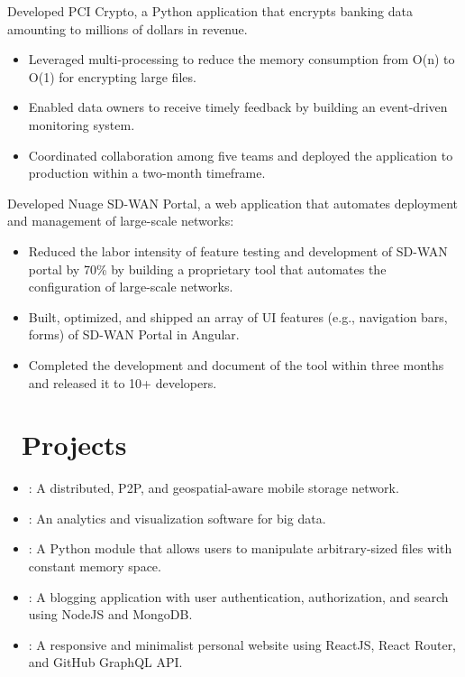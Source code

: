 \documentclass{resume}
\begin{document}
Developed PCI Crypto, a Python application that encrypts banking data amounting to millions of dollars in revenue.
\begin{itemize}
  \item {Leveraged multi-processing to reduce the memory consumption from O(n) to O(1) for encrypting large files.}
  \item {Enabled data owners to receive timely feedback by building an event-driven monitoring system.}
  \item {Coordinated collaboration among five teams and deployed the application to production within a two-month timeframe.}
\end{itemize}

Developed Nuage SD-WAN Portal, a web application that automates deployment and management of large-scale networks:
\begin{itemize}
  \item {Reduced the labor intensity of feature testing and development of SD-WAN portal by 70\%
        by building a proprietary tool that automates the configuration of large-scale networks.}
  \item {Built, optimized, and shipped an array of UI features (e.g., navigation bars, forms) of SD-WAN Portal in Angular.}
  \item {Completed the development and document of the tool within three months and released it to 10+ developers.}
\end{itemize}

\section{\faCodeFork\ Projects}
\begin{itemize}[parsep=0.5ex]
  \item {}: A distributed, P2P, and geospatial-aware mobile storage network.
  \item {}: An analytics and visualization software for big data.
  \item {}: A Python module that allows users to manipulate arbitrary-sized files with constant memory space.
  \item {}: A blogging application with user authentication, authorization, and search using NodeJS and MongoDB.
  \item {}: A responsive and minimalist personal website using ReactJS, React Router, and GitHub GraphQL API.
\end{itemize}
\end{document}
